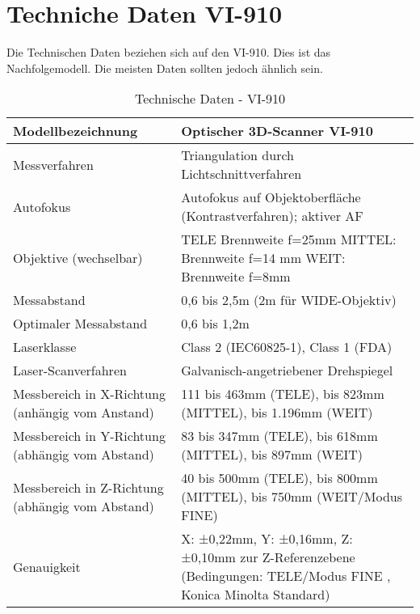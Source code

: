 
\section{Techniche Daten VI-910}
Die Technischen Daten beziehen sich auf den VI-910. Dies ist das Nachfolgemodell. Die meisten Daten sollten jedoch ähnlich sein.
\begin{longtable}{|m{4cm}|m{9cm}|} 
\caption{Technische Daten - VI-910} \\
\hline
\label{tab:TD_VI-910}
Modellbezeichnung & Optischer 3D-Scanner VI-910
 \\ \hline 
Messverfahren & Triangulation durch Lichtschnittverfahren
 \\ \hline 
Autofokus & Autofokus auf Objektoberfläche (Kontrastverfahren);  aktiver AF
 \\ \hline 
Objektive \newline  (wechselbar) & TELE Brennweite f=25mm  \newline 
MITTEL: Brennweite f=14 mm  \newline 
WEIT: Brennweite f=8mm
 \\ \hline 
Messabstand & 0,6 bis 2,5m (2m für WIDE-Objektiv)
 \\ \hline 
Optimaler Messabstand	 & 0,6 bis 1,2m
 \\ \hline 
Laserklasse & Class 2 (IEC60825-1), Class 1 (FDA)
 \\ \hline 
Laser-Scanverfahren	 & Galvanisch-angetriebener Drehspiegel
 \\ \hline 
Messbereich in  \newline X-Richtung (anhängig vom Anstand) & 111 bis 463mm (TELE),  \newline 198 bis 823mm (MITTEL), \newline  359 bis 1.196mm (WEIT)
 \\ \hline 
Messbereich in Y-Richtung (abhängig vom Abstand) & 83 bis 347mm (TELE), \newline  148 bis 618mm (MITTEL),  \newline 269 bis 897mm (WEIT)
 \\ \hline 
Messbereich in Z-Richtung (abhängig vom Abstand) & 40 bis 500mm (TELE), \newline  70 bis 800mm (MITTEL),  \newline 110 bis 750mm (WEIT/Modus FINE)
 \\ \hline 
Genauigkeit	 & X: ±0,22mm, Y: ±0,16mm, Z: ±0,10mm zur Z-Referenzebene (Bedingungen: TELE/Modus FINE , Konica Minolta Standard)
 \\ \hline 

\end{longtable}
